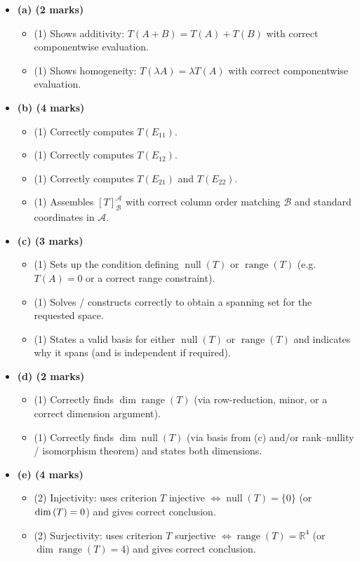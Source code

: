 \documentclass[12pt]{article}
\DeclareMathOperator{\range}{range}
\begin{document}
\begin{itemize}[leftmargin=1.6em]
  \item \textbf{(a) (2 marks)}
  \begin{itemize}[leftmargin=1.6em]
    \item (1) Shows additivity: $T(A+B)=T(A)+T(B)$ with correct componentwise evaluation.
    \item (1) Shows homogeneity: $T(\lambda A)=\lambda T(A)$ with correct componentwise evaluation.
  \end{itemize}

  \item \textbf{(b) (4 marks)}
  \begin{itemize}[leftmargin=1.6em]
    \item (1) Correctly computes $T(E_{11})$.
    \item (1) Correctly computes $T(E_{12})$.
    \item (1) Correctly computes $T(E_{21})$ and $T(E_{22})$.
    \item (1) Assembles $[T]_{\mathcal{B}}^{\mathcal{A}}$ with correct column order matching $\mathcal{B}$ and standard coordinates in $\mathcal{A}$.
  \end{itemize}

  \item \textbf{(c) (3 marks)}
  \begin{itemize}[leftmargin=1.6em]
    \item (1) Sets up the condition defining $\operatorname{null}(T)$ or $\operatorname{range}(T)$ (e.g.\ $T(A)=0$ or a correct range constraint).
    \item (1) Solves / constructs correctly to obtain a spanning set for the requested space.
    \item (1) States a valid basis for either $\operatorname{null}(T)$ or $\operatorname{range}(T)$ and indicates why it spans (and is independent if required).
  \end{itemize}

  \item \textbf{(d) (2 marks)}
  \begin{itemize}[leftmargin=1.6em]
    \item (1) Correctly finds $\dim\operatorname{range}(T)$ (via row-reduction, minor, or a correct dimension argument).
    \item (1) Correctly finds $\dim\operatorname{null}(T)$ (via basis from (c) and/or rank--nullity / isomorphism theorem) and states both dimensions.
  \end{itemize}

  \item \textbf{(e) (4 marks)}
  \begin{itemize}[leftmargin=1.6em]
    \item (2) Injectivity: uses criterion $T$ injective $\Leftrightarrow \operatorname{null}(T)=\{0\}$ (or $\dim\null(T)=0$) and gives correct conclusion.
    \item (2) Surjectivity: uses criterion $T$ surjective $\Leftrightarrow \operatorname{range}(T)=\mathbb{R}^4$ (or $\dim\range(T)=4$) and gives correct conclusion.
  \end{itemize}
\end{itemize}
\end{document}
